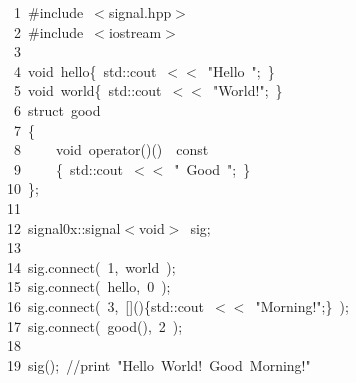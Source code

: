 \documentclass[9pt,onside,a4paper]{article}
\newcommand{\hlstd}[1]{\textcolor[rgb]{0.2,0,0.4}{#1}}
\newcommand{\hlnum}[1]{\textcolor[rgb]{0.2,0.73,0.02}{#1}}
\newcommand{\hlstr}[1]{\textcolor[rgb]{0.09,0.38,0.65}{#1}}
\newcommand{\hlslc}[1]{\textcolor[rgb]{0,0.4,0.2}{#1}}
\newcommand{\hlppc}[1]{\textcolor[rgb]{0.33,0.45,0.69}{#1}}
\newcommand{\hlopt}[1]{\textcolor[rgb]{0.33,0.33,0.33}{#1}}
\newcommand{\hllin}[1]{\textcolor[rgb]{0.6,0.6,0.6}{#1}}
\newcommand{\hlkwb}[1]{\textcolor[rgb]{0.96,0.55,0.14}{#1}}
\newcommand{\hlkwc}[1]{\textcolor[rgb]{0,0,1}{#1}}
\newcommand{\hlkwd}[1]{\textcolor[rgb]{0.82,0.11,0.93}{#1}}
\begin{document}
\noindent
\ttfamily
\hlstd{}\hllin{\ \ \ \ 1\ }\hlppc{\#include\ $<$signal.hpp$>$}\\
\hllin{\ \ \ \ 2\ }\hlstd{}\hlppc{\#include\ $<$iostream$>$}\\
\hllin{\ \ \ \ 3\ }\hlstd{}\\
\hllin{\ \ \ \ 4\ }\hlkwb{void\ }\hlstd{hello}\hlopt{\{\ }\hlstd{std}\hlopt{::}\hlstd{cout\ }\hlopt{$<$$<$\ }\hlstd{}\hlstr{"Hello\ "}\hlstd{}\hlopt{;\ \}}\\
\hllin{\ \ \ \ 5\ }\hlstd{}\hlkwb{void\ }\hlstd{world}\hlopt{\{\ }\hlstd{std}\hlopt{::}\hlstd{cout\ }\hlopt{$<$$<$\ }\hlstd{}\hlstr{"World!"}\hlstd{}\hlopt{;\ \}}\\
\hllin{\ \ \ \ 6\ }\hlstd{}\hlkwb{struct\ }\hlstd{good}\\
\hllin{\ \ \ \ 7\ }\hlopt{\{}\\
\hllin{\ \ \ \ 8\ }\hlstd{}\hlstd{\ \ \ \ }\hlstd{}\hlkwb{void\ }\hlstd{}\hlkwc{operator}\hlstd{}\hlopt{()()}\hlstd{\ \ }\hlopt{}\hlstd{}\hlkwb{const}\\
\hllin{\ \ \ \ 9\ }\hlstd{}\hlstd{\ \ \ \ }\hlstd{}\hlopt{\{\ }\hlstd{std}\hlopt{::}\hlstd{cout\ }\hlopt{$<$$<$\ }\hlstd{}\hlstr{"\ Good\ "}\hlstd{}\hlopt{;\ \}}\\
\hllin{\ \ \ 10\ }\hlstd{}\hlopt{\};}\\
\hllin{\ \ \ 11\ }\hlstd{\\
\hllin{\ \ \ 12\ }signal0x}\hlopt{::}\hlstd{signal}\hlopt{$<$}\hlstd{}\hlkwb{void}\hlstd{}\hlopt{$>$\ }\hlstd{sig}\hlopt{;}\\
\hllin{\ \ \ 13\ }\hlstd{\\
\hllin{\ \ \ 14\ }sig}\hlopt{.}\hlstd{}\hlkwd{connect}\hlstd{}\hlopt{(\ }\hlstd{}\hlnum{1}\hlstd{}\hlopt{,\ }\hlstd{world\ }\hlopt{);}\\
\hllin{\ \ \ 15\ }\hlstd{sig}\hlopt{.}\hlstd{}\hlkwd{connect}\hlstd{}\hlopt{(\ }\hlstd{hello}\hlopt{,\ }\hlstd{}\hlnum{0\ }\hlstd{}\hlopt{);}\\
\hllin{\ \ \ 16\ }\hlstd{sig}\hlopt{.}\hlstd{}\hlkwd{connect}\hlstd{}\hlopt{(\ }\hlstd{}\hlnum{3}\hlstd{}\hlopt{,\ {[}{]}()\{}\hlstd{std}\hlopt{::}\hlstd{cout\ }\hlopt{$<$$<$\ }\hlstd{}\hlstr{"Morning!"}\hlstd{}\hlopt{;\}\ );}\\
\hllin{\ \ \ 17\ }\hlstd{sig}\hlopt{.}\hlstd{}\hlkwd{connect}\hlstd{}\hlopt{(\ }\hlstd{}\hlkwd{good}\hlstd{}\hlopt{(),\ }\hlstd{}\hlnum{2\ }\hlstd{}\hlopt{);}\\
\hllin{\ \ \ 18\ }\hlstd{}\\
\hllin{\ \ \ 19\ }\hlkwd{sig}\hlstd{}\hlopt{();\ }\hlstd{}\hlslc{//print\ "Hello\ World!\ Good\ Morning!"}\hlstd{}\\
\mbox{}
\normalfont
\normalsize
\end{document}
